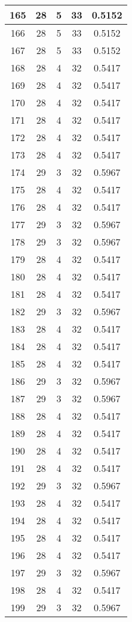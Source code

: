 \documentclass[letterpaper, 12pt]{article}
\begin{document}
\begin{longtable}{|c|c|c|c|c|}
\hline
165 & 28 & 5 & 33 & 0.5152 \\
\hline
166 & 28 & 5 & 33 & 0.5152 \\
\hline
167 & 28 & 5 & 33 & 0.5152 \\
\hline
168 & 28 & 4 & 32 & 0.5417 \\
\hline
169 & 28 & 4 & 32 & 0.5417 \\
\hline
170 & 28 & 4 & 32 & 0.5417 \\
\hline
171 & 28 & 4 & 32 & 0.5417 \\
\hline
172 & 28 & 4 & 32 & 0.5417 \\
\hline
173 & 28 & 4 & 32 & 0.5417 \\
\hline
174 & 29 & 3 & 32 & 0.5967 \\
\hline
175 & 28 & 4 & 32 & 0.5417 \\
\hline
176 & 28 & 4 & 32 & 0.5417 \\
\hline
177 & 29 & 3 & 32 & 0.5967 \\
\hline
178 & 29 & 3 & 32 & 0.5967 \\
\hline
179 & 28 & 4 & 32 & 0.5417 \\
\hline
180 & 28 & 4 & 32 & 0.5417 \\
\hline
181 & 28 & 4 & 32 & 0.5417 \\
\hline
182 & 29 & 3 & 32 & 0.5967 \\
\hline
183 & 28 & 4 & 32 & 0.5417 \\
\hline
184 & 28 & 4 & 32 & 0.5417 \\
\hline
185 & 28 & 4 & 32 & 0.5417 \\
\hline
186 & 29 & 3 & 32 & 0.5967 \\
\hline
187 & 29 & 3 & 32 & 0.5967 \\
\hline
188 & 28 & 4 & 32 & 0.5417 \\
\hline
189 & 28 & 4 & 32 & 0.5417 \\
\hline
190 & 28 & 4 & 32 & 0.5417 \\
\hline
191 & 28 & 4 & 32 & 0.5417 \\
\hline
192 & 29 & 3 & 32 & 0.5967 \\
\hline
193 & 28 & 4 & 32 & 0.5417 \\
\hline
194 & 28 & 4 & 32 & 0.5417 \\
\hline
195 & 28 & 4 & 32 & 0.5417 \\
\hline
196 & 28 & 4 & 32 & 0.5417 \\
\hline
197 & 29 & 3 & 32 & 0.5967 \\
\hline
198 & 28 & 4 & 32 & 0.5417 \\
\hline
199 & 29 & 3 & 32 & 0.5967 \\
\hline
\end{longtable}
\end{document}
